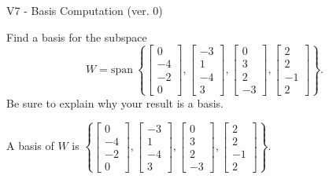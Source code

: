 \begin{exercise}
  \begin{exerciseTitle}V7 - Basis Computation (ver. 0)\end{exerciseTitle}
  \begin{exerciseStatement}
    Find a basis for the subspace 
\[W=\mathrm{span}\ \left\{\left[\begin{array}{r}
0 \\
-4 \\
-2 \\
0
\end{array}\right] , \left[\begin{array}{r}
-3 \\
1 \\
-4 \\
3
\end{array}\right] , \left[\begin{array}{r}
0 \\
3 \\
2 \\
-3
\end{array}\right] , \left[\begin{array}{r}
2 \\
2 \\
-1 \\
2
\end{array}\right]\right\}.\]
 Be sure to explain why your result is a basis.


  \end{exerciseStatement}
  \begin{exerciseAnswer}
   A basis of \(W\) is  \(\left\{\left[\begin{array}{r}
0 \\
-4 \\
-2 \\
0
\end{array}\right] , \left[\begin{array}{r}
-3 \\
1 \\
-4 \\
3
\end{array}\right] , \left[\begin{array}{r}
0 \\
3 \\
2 \\
-3
\end{array}\right] , \left[\begin{array}{r}
2 \\
2 \\
-1 \\
2
\end{array}\right]\right\}\).
  


  \end{exerciseAnswer}
\end{exercise}